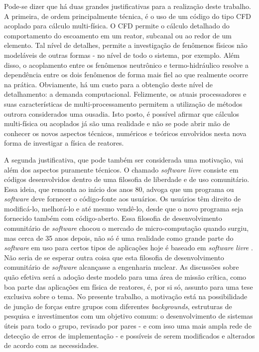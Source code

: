 Pode-se dizer que há duas grandes justificativas para a realização deste trabalho. A primeira, de ordem principalmente
técnica, é o uso de um código do tipo CFD acoplado para cálculo multi-física. O CFD permite o cálculo detalhado do
comportamento do escoamento em um reator, subcanal ou ao redor de um elemento. Tal nível de detalhes, permite a
investigação de fenômenos físicos não modeláveis de outras formas - no nível de todo o sistema, por exemplo. Além disso,
o acoplamento entre os fenômenos neutrônico e termo-hidráulico resolve a dependência entre os dois fenômenos de forma
mais fiel ao que realmente ocorre na prática. Obviamente, há um custo para a obtenção deste nível de detalhamento: a
demanda computacional. Felizmente, os atuais processadores e suas características de multi-processamento permitem
a utilização de métodos outrora considerados uma ousadia. Isto posto, é possível afirmar que cálculos multi-física ou
acoplados já são uma realidade e não se pode abrir mão de conhecer os novos aspectos técnicos, numéricos e teóricos
envolvidos nesta nova forma de investigar a física de reatores.

A segunda justificativa, que pode também ser considerada uma motivação, vai além dos aspectos puramente técnicos.
O chamado \textit{software livre} consiste em códigos desenvolvidos dentro de uma filosofia de liberdade e de uso
comunitário. Essa ideia, que remonta ao início dos anos 80, advoga que um programa ou \textit{software} deve fornecer
o código-fonte aos usuários. Os usuários têm direito de modificá-lo, melhorá-lo e até mesmo vendê-lo, desde que o novo
programa seja fornecido também com código-aberto. Essa filosofia de desenvolvimento comunitário de \textit{software}
chocou o mercado de micro-computação quando surgiu, mas cerca de 35 anos depois, não só é uma realidade como
grande parte do \textit{software} em uso para certos tipos de aplicações hoje é baseado em \textit{software livre}
\cite{Androutsellis2010}. Não seria de se esperar outra coisa que esta filosofia de desenvolvimento comunitário de
\textit{software} alcançasse a engenharia nuclear. As discussões sobre quão efetiva será a adoção deste modelo
para uma área de missão crítica, como boa parte das aplicações em física de reatores, é, por si só, assunto para uma
tese exclusiva sobre o tema. No presente trabalho, a motivação está na possibilidade de junção de forças entre grupos com
diferentes \textit{backgrounds}, estruturas de pesquisa e investimentos com um objetivo comum: o desenvolvimento
de sistemas úteis para todo o grupo, revisado por pares - e com isso uma mais ampla rede de detecção de erros
de implementação - e possíveis de serem modificados e alterados de acordo com as necessidades.

